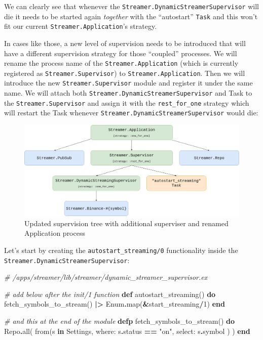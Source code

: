 \documentclass[
]{book}
\newenvironment{Shaded}{\begin{snugshade}}{\end{snugshade}}
\newcommand{\CommentTok}[1]{\textcolor[rgb]{0.56,0.35,0.01}{\textit{#1}}}
\newcommand{\ConstantTok}[1]{\textcolor[rgb]{0.00,0.00,0.00}{#1}}
\newcommand{\DecValTok}[1]{\textcolor[rgb]{0.00,0.00,0.81}{#1}}
\newcommand{\KeywordTok}[1]{\textcolor[rgb]{0.13,0.29,0.53}{\textbf{#1}}}
\newcommand{\NormalTok}[1]{#1}
\newcommand{\OperatorTok}[1]{\textcolor[rgb]{0.81,0.36,0.00}{\textbf{#1}}}
\newcommand{\StringTok}[1]{\textcolor[rgb]{0.31,0.60,0.02}{#1}}
\newcommand{\VariableTok}[1]{\textcolor[rgb]{0.00,0.00,0.00}{#1}}
\begin{document}
We can clearly see that whenever the \texttt{Streamer.DynamicStreamerSupervisor} will die it needs to be started again \emph{together} with the ``autostart'' \texttt{Task} and this won't fit our current \texttt{Streamer.Application}'s strategy.

In cases like those, a new level of supervision needs to be introduced that will have a different supervision strategy for those ``coupled'' processes. We will rename the process name of the \texttt{Streamer.Application} (which is currently registered as \texttt{Streamer.Supervisor}) to \texttt{Streamer.Application}. Then we will introduce the new \texttt{Streamer.Supervisor} module and register it under the same name. We will attach both \texttt{Streamer.DynamicStreamerSupervisor} and Task to the \texttt{Streamer.Supervisor} and assign it with the \texttt{rest\_for\_one} strategy which will restart the Task whenever \texttt{Streamer.DynamicStreamerSupervisor} would die:

\begin{figure}
\centering
\includegraphics{images/chapter_11_04_new_sup_tree.png}
\caption{Updated supervision tree with additional superviser and renamed Application process}
\end{figure}

Let's start by creating the \texttt{autostart\_streaming/0} functionality inside the \texttt{Streamer.DynamicStreamerSupervisor}:

\begin{Shaded}
\begin{Highlighting}[]
  \CommentTok{\# /apps/streamer/lib/streamer/dynamic\_streamer\_supervisor.ex}

  \CommentTok{\# add below after the \textasciigrave{}init/1\textasciigrave{} function}
  \KeywordTok{def}\NormalTok{ autostart\_streaming() }\KeywordTok{do}
\NormalTok{    fetch\_symbols\_to\_stream()}
    \OperatorTok{|\textgreater{}} \ConstantTok{Enum}\OperatorTok{.}\NormalTok{map(}\OperatorTok{\&}\NormalTok{start\_streaming}\OperatorTok{/}\DecValTok{1}\NormalTok{)}
  \KeywordTok{end}

  \CommentTok{\# and this at the end of the module}
  \KeywordTok{defp}\NormalTok{ fetch\_symbols\_to\_stream() }\KeywordTok{do}
    \ConstantTok{Repo}\OperatorTok{.}\NormalTok{all(}
\NormalTok{      from(s }\KeywordTok{in} \ConstantTok{Settings}\NormalTok{,}
        \VariableTok{where:}\NormalTok{ s}\OperatorTok{.}\NormalTok{status }\OperatorTok{==} \StringTok{"on"}\NormalTok{,}
        \VariableTok{select:}\NormalTok{ s}\OperatorTok{.}\NormalTok{symbol}
\NormalTok{      )}
\NormalTok{    )}
  \KeywordTok{end}
\end{Highlighting}
\end{Shaded}
\end{document}
